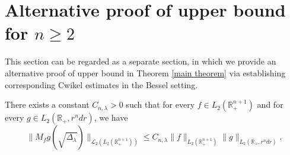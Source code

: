 \documentclass[12pt]{amsart}
\begin{document}
\section{Alternative proof of upper bound for $n\geq 2$}\label{alternativepf}
\setcounter{equation}{0}

This section can be regarded as a separate section, in which we provide an alternative proof of upper bound in Theorem \ref{main theorem} via establishing corresponding Cwikel estimates in the Bessel setting.

\begin{lemma}\label{L2Cwikel}
There exists a constant $C_{n,\lambda}>0$ such that for every $f\in L_2(\mathbb{R}_+^{n+1})$ and for every $g\in L_2(\mathbb{R}_+,r^ndr)$, we have
$$\|M_fg(\sqrt{\Delta_{\lambda}})\|_{\mathcal{L}_2(L_2(\mathbb{R}_+^{n+1}))}\leq C_{n,\lambda}\|f\|_{L_2(\mathbb{R}_+^{n+1})}\|g\|_{L_2(\mathbb{R}_+,r^ndr)}.$$
\end{lemma}
\end{document}

